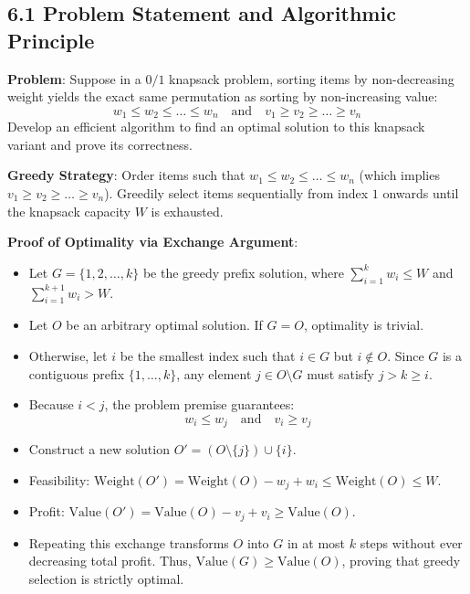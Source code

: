 \documentclass[12pt]{article}
\begin{document}
\subsection*{6.1 Problem Statement and Algorithmic Principle}
\textbf{Problem}: Suppose in a $0/1$ knapsack problem, sorting items by non-decreasing weight yields the exact same permutation as sorting by non-increasing value:
\[
w_1 \le w_2 \le \dots \le w_n \quad \text{and} \quad v_1 \ge v_2 \ge \dots \ge v_n
\]
Develop an efficient algorithm to find an optimal solution to this knapsack variant and prove its correctness.

\textbf{Greedy Strategy}:
Order items such that $w_1 \le w_2 \le \dots \le w_n$ (which implies $v_1 \ge v_2 \ge \dots \ge v_n$). Greedily select items sequentially from index $1$ onwards until the knapsack capacity $W$ is exhausted.

\textbf{Proof of Optimality via Exchange Argument}:
\begin{itemize}
    \item Let $G = \{1, 2, \dots, k\}$ be the greedy prefix solution, where $\sum_{i=1}^k w_i \le W$ and $\sum_{i=1}^{k+1} w_i > W$.
    \item Let $O$ be an arbitrary optimal solution. If $G = O$, optimality is trivial.
    \item Otherwise, let $i$ be the smallest index such that $i \in G$ but $i \notin O$. Since $G$ is a contiguous prefix $\{1, \dots, k\}$, any element $j \in O \setminus G$ must satisfy $j > k \ge i$.
    \item Because $i < j$, the problem premise guarantees:
    \[
    w_i \le w_j \quad \text{and} \quad v_i \ge v_j
    \]
    \item Construct a new solution $O' = (O \setminus \{j\}) \cup \{i\}$.
    \item Feasibility: $\text{Weight}(O') = \text{Weight}(O) - w_j + w_i \le \text{Weight}(O) \le W$.
    \item Profit: $\text{Value}(O') = \text{Value}(O) - v_j + v_i \ge \text{Value}(O)$.
    \item Repeating this exchange transforms $O$ into $G$ in at most $k$ steps without ever decreasing total profit. Thus, $\text{Value}(G) \ge \text{Value}(O)$, proving that greedy selection is strictly optimal.
\end{itemize}
\end{document}
